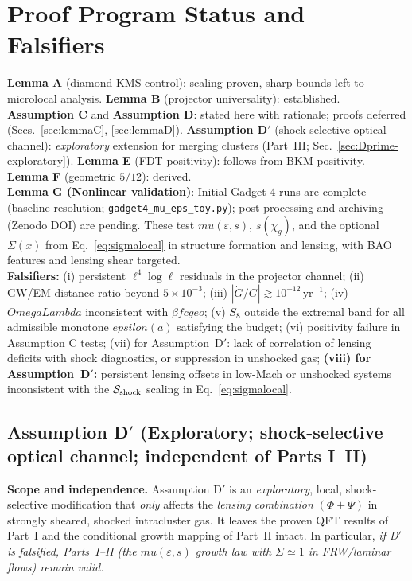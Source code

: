 \documentclass[aps,prd,onecolumn,superscriptaddress,nofootinbib]{revtex4-2}
\def\OmL{OmegaLambda}%
\def\cgeo{cgeo}%
\def\eps{epsilon}%
\def\mu{mu}%
\def\Omega_\Lambda{OmegaLambda}%
\providecommand{\OmL}{\Omega_\Lambda}
\providecommand{\cgeo}{c_{\rm geo}}
\providecommand{\eps}{\varepsilon}
\begin{document}
\section{Proof Program Status and Falsifiers}
\label{sec:program}
\textbf{Lemma A} (diamond KMS control): scaling proven, sharp bounds left to microlocal analysis. \textbf{Lemma B} (projector universality): established. \textbf{Assumption C} and \textbf{Assumption D}: stated here with rationale; proofs deferred (Secs.~\ref{sec:lemmaC}, \ref{sec:lemmaD}). \textbf{Assumption D$'$} (shock-selective optical channel): \emph{exploratory} extension for merging clusters (Part~III; Sec.~\ref{sec:Dprime-exploratory}). \textbf{Lemma E} (FDT positivity): follows from BKM positivity. \textbf{Lemma F} (geometric \(5/12\)): derived.\\
\textbf{Lemma G (Nonlinear validation)}: Initial Gadget-4 runs are complete (baseline resolution; \texttt{gadget4\_mu\_eps\_toy.py}); post-processing and archiving (Zenodo DOI) are pending. These test \(\mu(\varepsilon,s)\), \(s(\chi_g)\), and the optional \(\Sigma(x)\) from Eq.~\eqref{eq:sigmalocal} in structure formation and lensing, with BAO features and lensing shear targeted.\\
\textbf{Falsifiers:} (i) persistent \(\ell^4\log\ell\) residuals in the projector channel; (ii) GW/EM distance ratio beyond \(5\times 10^{-3}\); (iii) \(|\dot G/G|\gtrsim 10^{-12}\,\mathrm{yr}^{-1}\); (iv) \(\OmL\) inconsistent with \(\beta f\cgeo\); (v) \(S_8\) outside the extremal band for all admissible monotone \(\eps(a)\) satisfying the budget; (vi) positivity failure in Assumption C tests; (vii) for Assumption~D$'$: lack of correlation of lensing deficits with shock diagnostics, or suppression in unshocked gas; \textbf{(viii) for Assumption~D$'$:} persistent lensing offsets in low-Mach or unshocked systems inconsistent with the \(\mathcal S_{\rm shock}\) scaling in Eq.~\eqref{eq:sigmalocal}.

\subsection{Assumption D\texorpdfstring{$'$}{'} (Exploratory; shock-selective optical channel; independent of Parts I–II)}
\label{sec:lemmaDprime}

\noindent\textbf{Scope and independence.}
Assumption D$'$ is an \emph{exploratory}, local, shock-selective modification that \emph{only} affects the \emph{lensing combination} $(\Phi+\Psi)$ in strongly sheared, shocked intracluster gas. It leaves the proven QFT results of Part~I and the conditional growth mapping of Part~II intact. In particular, \emph{if D$'$ is falsified, Parts~I–II (the $\mu(\varepsilon,s)$ growth law with $\Sigma\simeq 1$ in FRW/laminar flows) remain valid.}
\end{document}
